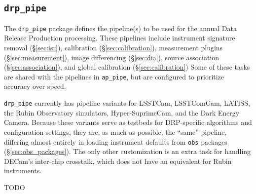 \subsection{\texttt{drp\_pipe}}
\label{sec:drp_pipe}

The \texttt{drp\_pipe} package defines the pipeline(s) to be used for the annual Data Release Production processing.
These pipelines include instrument signature removal (\S\ref{sec:isr}), calibration (\S\ref{sec:calibration}), measurement plugins (\S\ref{sec:measurement}), image differencing (\S\ref{sec:dia}), source association (\S\ref{sec:association}), and global calibration (\S\ref{sec:calibration})
Some of these tasks are shared with the pipelines in \texttt{ap\_pipe}, but are configured to prioritize accuracy over speed.

\texttt{drp\_pipe} currently has pipeline variants for LSSTCam, LSSTComCam, LATISS, the Rubin Observatory simulators, Hyper-SuprimeCam, and the Dark Energy Camera.
Because these variants serve as testbeds for DRP-specific algorithms and configuration settings, they are, as much as possible, the ``same'' pipeline, differing almost entirely in loading instrument defaults from \texttt{obs} packages (\S\ref{sec:obs_packages}).
The only other customization is an extra task for handling DECam's inter-chip crosstalk, which does not have an equivalent for Rubin instruments.

TODO
